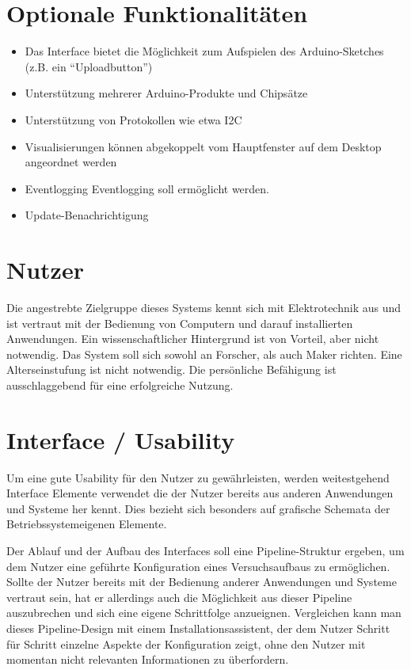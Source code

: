 \section{Optionale Funktionalitäten}
\begin{itemize}
 \item Das Interface bietet die Möglichkeit zum Aufspielen des Arduino-Sketches (z.B. ein ``Uploadbutton'')
 \item Unterstützung mehrerer Arduino-Produkte und Chipsätze
 \item Unterstützung von Protokollen wie etwa I2C
 \item Visualisierungen können abgekoppelt vom Hauptfenster auf dem Desktop angeordnet werden
 \item Eventlogging \gls{Eventlogging} soll ermöglicht werden.
 \item Update-Benachrichtigung
\end{itemize}

\section{Nutzer}
Die angestrebte Zielgruppe dieses Systems kennt sich mit Elektrotechnik aus und ist vertraut mit der Bedienung von Computern und darauf installierten Anwendungen. Ein wissenschaftlicher Hintergrund ist von Vorteil, aber nicht notwendig. Das System soll sich sowohl an Forscher, als auch \gls{Maker} richten.
Eine Alterseinstufung ist nicht notwendig. Die persönliche Befähigung ist ausschlaggebend für eine erfolgreiche Nutzung.

\section{Interface / Usability}
Um eine gute Usability für den Nutzer zu gewährleisten, werden weitestgehend Interface Elemente verwendet die der Nutzer bereits aus anderen Anwendungen und Systeme her kennt.
Dies bezieht sich besonders auf grafische Schemata der Betriebssystemeigenen Elemente. %

Der Ablauf und der Aufbau des Interfaces soll eine Pipeline-Struktur ergeben, um dem Nutzer eine geführte Konfiguration eines Versuchsaufbaus zu ermöglichen. Sollte der Nutzer bereits mit der Bedienung anderer Anwendungen und Systeme vertraut sein, hat er allerdings auch die Möglichkeit aus dieser Pipeline auszubrechen und sich eine eigene Schrittfolge anzueignen. Vergleichen kann man dieses Pipeline-Design mit einem Installationsassistent, der dem Nutzer Schritt für Schritt einzelne Aspekte der Konfiguration zeigt, ohne den Nutzer mit momentan nicht relevanten Informationen zu überfordern.

